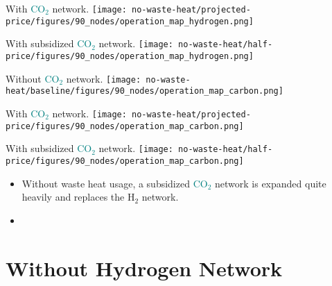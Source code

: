 \documentclass[12pt, aspectratio=169]{beamer}
\newcommand{\carbon}{\textcolor{teal}{CO$_2$}}
\newcommand{\hydrogen}{H$_2$}
\begin{document}
\begin{frame}
    \begin{center}
    With \carbon{} network.
    \texttt{[image: no-waste-heat/projected-price/figures/90\_nodes/operation\_map\_hydrogen.png]}
    \end{center}
\end{frame}

\begin{frame}
    \begin{center}
    With subsidized \carbon{} network.
    \texttt{[image: no-waste-heat/half-price/figures/90\_nodes/operation\_map\_hydrogen.png]}
    \end{center}
\end{frame}


\begin{frame}
    \begin{center}
    Without \carbon{} network.
    \texttt{[image: no-waste-heat/baseline/figures/90\_nodes/operation\_map\_carbon.png]}
    \end{center}
\end{frame}


\begin{frame}
    \begin{center}
    With \carbon{} network.
    \texttt{[image: no-waste-heat/projected-price/figures/90\_nodes/operation\_map\_carbon.png]}
    \end{center}
\end{frame}

\begin{frame}
    \begin{center}
    With subsidized \carbon{} network.
    \texttt{[image: no-waste-heat/half-price/figures/90\_nodes/operation\_map\_carbon.png]}
    \end{center}
\end{frame}


\begin{frame}
    \begin{itemize}
        \item Without waste heat usage, a subsidized \carbon{} network is expanded quite heavily and replaces the \hydrogen{} network.
        \item
    \end{itemize}

\end{frame}


\section{Without Hydrogen Network}
\end{document}
